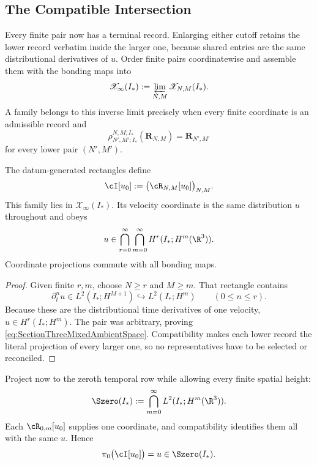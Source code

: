 \subsection{The Compatible Intersection}\label{sub:TheCompatibleIntersection}

Every finite pair now has a terminal record.  Enlarging either cutoff retains
the lower record verbatim inside the larger one, because shared entries are the
same distributional derivatives of \(u\).  Order finite pairs coordinatewise
and assemble them with the bonding maps into
\[
  \mathscr X_\infty(I_*)
  :=
  \varprojlim_{N,M}\mathscr X_{N,M}(I_*).
\]
A family belongs to this inverse limit precisely when every finite coordinate
is an admissible record and
\[
  \rho_{N',M';I_*}^{N,M;I_*}(\mathbf R_{N,M})
  =\mathbf R_{N',M'}
\]
for every lower pair \((N',M')\).

\begin{proposition}\label{prop:CompatibleProjectiveAssembly}
The datum-generated rectangles define
\[
  \cI[u_0]
  :=
  \bigl(\cR_{N,M}[u_0]\bigr)_{N,M}.
\]
This family lies in \(\mathscr X_\infty(I_*)\).  Its velocity coordinate is the
same distribution \(u\) throughout and obeys
\begin{equation}\label{eq:SectionThreeMixedAmbientSpace}
  u\in
  \bigcap_{r=0}^{\infty}
  \bigcap_{m=0}^{\infty}
  H^r(I_*;H^m(\R^3)).
\end{equation}
Coordinate projections commute with all bonding maps.
\end{proposition}

\begin{proof}
Given finite \(r,m\), choose \(N\geq r\) and \(M\geq m\).  That rectangle
contains
\[
  \partial_t^n u\in L^2(I_*;H^{M+1})
  \hookrightarrow L^2(I_*;H^m)
  \qquad(0\leq n\leq r).
\]
Because these are the distributional time derivatives of one velocity,
\(u\in H^r(I_*;H^m)\).  The pair was arbitrary, proving
\eqref{eq:SectionThreeMixedAmbientSpace}.  Compatibility makes each lower
record the literal projection of every larger one, so no representatives have
to be selected or reconciled.
\end{proof}

Project now to the zeroth temporal row while allowing every finite spatial
height:
\begin{equation}\label{eq:SectionThreeCompleteSpatialRow}
  \Szero(I_*)
  :=\bigcap_{m=0}^{\infty}L^2(I_*;H^m(\R^3)).
\end{equation}
Each \(\cR_{0,m}[u_0]\) supplies one coordinate, and compatibility identifies
them all with the same \(u\).  Hence
\[
  \pi_0\bigl(\cI[u_0]\bigr)
  =u\in\Szero(I_*).
\]

